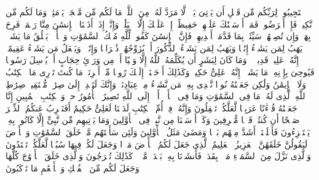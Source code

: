 \stopbuffer%
\startbuffer[\q:42:47]
ٱسۡتَجِیبُوا۟ لِرَبِّكُم مِّن قَبۡلِ أَن یَأۡتِیَ یَوۡمࣱ لَّا مَرَدَّ لَهُۥ مِنَ ٱللَّهِۚ مَا لَكُم مِّن مَّلۡجَإࣲ یَوۡمَئِذࣲ وَمَا لَكُم مِّن نَّكِیرࣲ%
\stopbuffer%
\startbuffer[\q:42:48]
فَإِنۡ أَعۡرَضُوا۟ فَمَاۤ أَرۡسَلۡنَٰكَ عَلَیۡهِمۡ حَفِیظًاۖ إِنۡ عَلَیۡكَ إِلَّا ٱلۡبَلَٰغُۗ وَإِنَّاۤ إِذَاۤ أَذَقۡنَا ٱلۡإِنسَٰنَ مِنَّا رَحۡمَةࣰ فَرِحَ بِهَاۖ وَإِن تُصِبۡهُمۡ سَیِّئَةُۢ بِمَا قَدَّمَتۡ أَیۡدِیهِمۡ فَإِنَّ ٱلۡإِنسَٰنَ كَفُورࣱ%
\stopbuffer%
\startbuffer[\q:42:49]
لِّلَّهِ مُلۡكُ ٱلسَّمَٰوَٰتِ وَٱلۡأَرۡضِۚ یَخۡلُقُ مَا یَشَاۤءُۚ یَهَبُ لِمَن یَشَاۤءُ إِنَٰثࣰا وَیَهَبُ لِمَن یَشَاۤءُ ٱلذُّكُورَ%
\stopbuffer%
\startbuffer[\q:42:50]
أَوۡ یُزَوِّجُهُمۡ ذُكۡرَانࣰا وَإِنَٰثࣰاۖ وَیَجۡعَلُ مَن یَشَاۤءُ عَقِیمًاۚ إِنَّهُۥ عَلِیمࣱ قَدِیرࣱ%
\stopbuffer%
\startbuffer[\q:42:51]
۞ وَمَا كَانَ لِبَشَرٍ أَن یُكَلِّمَهُ ٱللَّهُ إِلَّا وَحۡیًا أَوۡ مِن وَرَاۤئِ حِجَابٍ أَوۡ یُرۡسِلَ رَسُولࣰا فَیُوحِیَ بِإِذۡنِهِۦ مَا یَشَاۤءُۚ إِنَّهُۥ عَلِیٌّ حَكِیمࣱ%
\stopbuffer%
\startbuffer[\q:42:52]
وَكَذَٰلِكَ أَوۡحَیۡنَاۤ إِلَیۡكَ رُوحࣰا مِّنۡ أَمۡرِنَاۚ مَا كُنتَ تَدۡرِی مَا ٱلۡكِتَٰبُ وَلَا ٱلۡإِیمَٰنُ وَلَٰكِن جَعَلۡنَٰهُ نُورࣰا نَّهۡدِی بِهِۦ مَن نَّشَاۤءُ مِنۡ عِبَادِنَاۚ وَإِنَّكَ لَتَهۡدِیۤ إِلَىٰ صِرَٰطࣲ مُّسۡتَقِیمࣲ%
\stopbuffer%
\startbuffer[\q:42:53]
صِرَٰطِ ٱللَّهِ ٱلَّذِی لَهُۥ مَا فِی ٱلسَّمَٰوَٰتِ وَمَا فِی ٱلۡأَرۡضِۗ أَلَاۤ إِلَى ٱللَّهِ تَصِیرُ ٱلۡأُمُورُ%
\stopbuffer%
\startbuffer[\q:43:1]
حمۤ%
\stopbuffer%
\startbuffer[\q:43:2]
وَٱلۡكِتَٰبِ ٱلۡمُبِینِ%
\stopbuffer%
\startbuffer[\q:43:3]
إِنَّا جَعَلۡنَٰهُ قُرۡءَٰنًا عَرَبِیࣰّا لَّعَلَّكُمۡ تَعۡقِلُونَ%
\stopbuffer%
\startbuffer[\q:43:4]
وَإِنَّهُۥ فِیۤ أُمِّ ٱلۡكِتَٰبِ لَدَیۡنَا لَعَلِیٌّ حَكِیمٌ%
\stopbuffer%
\startbuffer[\q:43:5]
أَفَنَضۡرِبُ عَنكُمُ ٱلذِّكۡرَ صَفۡحًا أَن كُنتُمۡ قَوۡمࣰا مُّسۡرِفِینَ%
\stopbuffer%
\startbuffer[\q:43:6]
وَكَمۡ أَرۡسَلۡنَا مِن نَّبِیࣲّ فِی ٱلۡأَوَّلِینَ%
\stopbuffer%
\startbuffer[\q:43:7]
وَمَا یَأۡتِیهِم مِّن نَّبِیٍّ إِلَّا كَانُوا۟ بِهِۦ یَسۡتَهۡزِءُونَ%
\stopbuffer%
\startbuffer[\q:43:8]
فَأَهۡلَكۡنَاۤ أَشَدَّ مِنۡهُم بَطۡشࣰا وَمَضَىٰ مَثَلُ ٱلۡأَوَّلِینَ%
\stopbuffer%
\startbuffer[\q:43:9]
وَلَئِن سَأَلۡتَهُم مَّنۡ خَلَقَ ٱلسَّمَٰوَٰتِ وَٱلۡأَرۡضَ لَیَقُولُنَّ خَلَقَهُنَّ ٱلۡعَزِیزُ ٱلۡعَلِیمُ%
\stopbuffer%
\startbuffer[\q:43:10]
ٱلَّذِی جَعَلَ لَكُمُ ٱلۡأَرۡضَ مَهۡدࣰا وَجَعَلَ لَكُمۡ فِیهَا سُبُلࣰا لَّعَلَّكُمۡ تَهۡتَدُونَ%
\stopbuffer%
\startbuffer[\q:43:11]
وَٱلَّذِی نَزَّلَ مِنَ ٱلسَّمَاۤءِ مَاۤءَۢ بِقَدَرࣲ فَأَنشَرۡنَا بِهِۦ بَلۡدَةࣰ مَّیۡتࣰاۚ كَذَٰلِكَ تُخۡرَجُونَ%
\stopbuffer%
\startbuffer[\q:43:12]
وَٱلَّذِی خَلَقَ ٱلۡأَزۡوَٰجَ كُلَّهَا وَجَعَلَ لَكُم مِّنَ ٱلۡفُلۡكِ وَٱلۡأَنۡعَٰمِ مَا تَرۡكَبُونَ%
